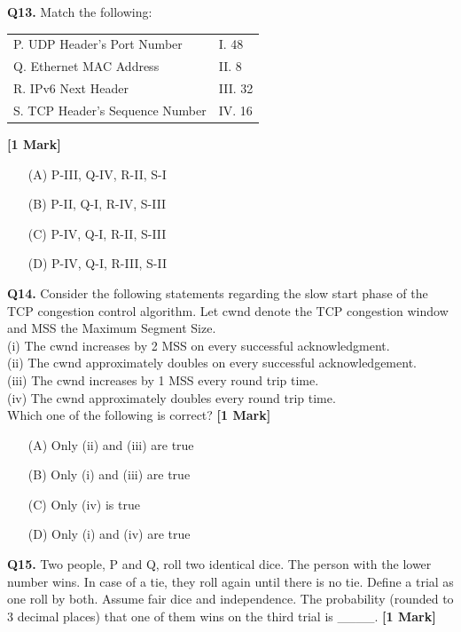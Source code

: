 \documentclass[11pt]{article}
\newcommand{\questiona}[2]{
    \noindent\textbf{Q#2.} #1 \hfill \textbf{[1 Mark]}
}
\begin{document}
\questiona{Match the following:\\
\begin{tabular}{ll}
P. UDP Header’s Port Number & I. 48 \\
Q. Ethernet MAC Address & II. 8 \\
R. IPv6 Next Header & III. 32 \\
S. TCP Header’s Sequence Number & IV. 16 \\
\end{tabular}}{13}
\begin{enumerate}
    \item[(A)] P-III, Q-IV, R-II, S-I
    \item[(B)] P-II, Q-I, R-IV, S-III
    \item[(C)] P-IV, Q-I, R-II, S-III
    \item[(D)] P-IV, Q-I, R-III, S-II
\end{enumerate}
\vspace{0.5cm}

\questiona{Consider the following statements regarding the slow start phase of the TCP congestion control algorithm. Let cwnd denote the TCP congestion window and MSS the Maximum Segment Size.\\
(i) The cwnd increases by 2 MSS on every successful acknowledgment.\\
(ii) The cwnd approximately doubles on every successful acknowledgement.\\
(iii) The cwnd increases by 1 MSS every round trip time.\\
(iv) The cwnd approximately doubles every round trip time.\\
Which one of the following is correct?}{14}
\begin{enumerate}
    \item[(A)] Only (ii) and (iii) are true
    \item[(B)] Only (i) and (iii) are true
    \item[(C)] Only (iv) is true
    \item[(D)] Only (i) and (iv) are true
\end{enumerate}
\vspace{0.5cm}

\questiona{Two people, P and Q, roll two identical dice. The person with the lower number wins. In case of a tie, they roll again until there is no tie. Define a trial as one roll by both. Assume fair dice and independence. The probability (rounded to 3 decimal places) that one of them wins on the third trial is \_\_\_\_.}{15}
\vspace{0.5cm}
\end{document}
